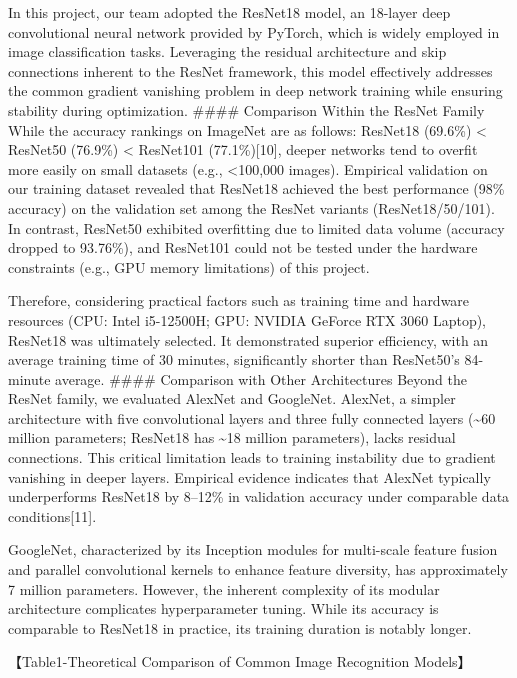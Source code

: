 In this project, our team adopted the ResNet18 model, an 18-layer deep
convolutional neural network provided by PyTorch, which is widely
employed in image classification tasks. Leveraging the residual
architecture and skip connections inherent to the ResNet framework, this
model effectively addresses the common gradient vanishing problem in
deep network training while ensuring stability during optimization.
\#\#\#\# Comparison Within the ResNet Family While the accuracy rankings
on ImageNet are as follows: ResNet18 (69.6\%) \textless{} ResNet50
(76.9\%) \textless{} ResNet101 (77.1\%){[}10{]}, deeper networks tend to
overfit more easily on small datasets (e.g., \textless100,000 images).
Empirical validation on our training dataset revealed that ResNet18
achieved the best performance (98\% accuracy) on the validation set
among the ResNet variants (ResNet18/50/101). In contrast, ResNet50
exhibited overfitting due to limited data volume (accuracy dropped to
93.76\%), and ResNet101 could not be tested under the hardware
constraints (e.g., GPU memory limitations) of this project.

Therefore, considering practical factors such as training time and
hardware resources (CPU: Intel i5-12500H; GPU: NVIDIA GeForce RTX 3060
Laptop), ResNet18 was ultimately selected. It demonstrated superior
efficiency, with an average training time of 30 minutes, significantly
shorter than ResNet50's 84-minute average. \#\#\#\# Comparison with
Other Architectures Beyond the ResNet family, we evaluated AlexNet and
GoogleNet. AlexNet, a simpler architecture with five convolutional
layers and three fully connected layers (\textasciitilde60 million
parameters; ResNet18 has \textasciitilde18 million parameters), lacks
residual connections. This critical limitation leads to training
instability due to gradient vanishing in deeper layers. Empirical
evidence indicates that AlexNet typically underperforms ResNet18 by
8--12\% in validation accuracy under comparable data conditions{[}11{]}.

GoogleNet, characterized by its Inception modules for multi-scale
feature fusion and parallel convolutional kernels to enhance feature
diversity, has approximately 7 million parameters. However, the inherent
complexity of its modular architecture complicates hyperparameter
tuning. While its accuracy is comparable to ResNet18 in practice, its
training duration is notably longer.

【Table1-Theoretical Comparison of Common Image Recognition Models】

